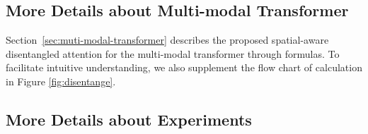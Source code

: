 \documentclass[11pt]{article}
\begin{document}
\subsection{More Details about Multi-modal Transformer}
\label{sec:detail_disentangle}
Section~\ref{sec:muti-modal-transformer} describes the proposed spatial-aware disentangled attention for the multi-modal transformer through formulas.
To facilitate intuitive understanding, we also supplement the flow chart of calculation in Figure \ref{fig:disentange}.


\begin{table*}[t]
\centering
\small
{}
\caption{Results of ERNIE-Layout (base-level model) and previous methods on various downstream VrDU tasks. $^\dag$ marks the results without any description of fine-tuning set (train or train+dev), The bold and underlined scores indicate the best and second results, respectively.}
\label{tab:base_results}
\end{table*}


\subsection{More Details about Experiments}
\label{sec:detail_finetuning_datasets}
\end{document}
